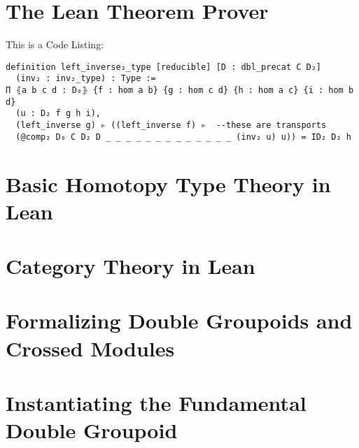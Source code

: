\section{The Lean Theorem Prover}


This is a Code Listing:
\begin{verbatim}
definition left_inverse₂_type [reducible] [D : dbl_precat C D₂] 
  (inv₂ : inv₂_type) : Type :=
Π ⦃a b c d : D₀⦄ {f : hom a b} {g : hom c d} {h : hom a c} {i : hom b d}
  (u : D₂ f g h i),
  (left_inverse g) ▹ ((left_inverse f) ▹  --these are transports
  (@comp₂ D₀ C D₂ D _ _ _ _ _ _ _ _ _ _ _ _ _ (inv₂ u) u)) = ID₂ D₂ h
\end{verbatim}

\section{Basic Homotopy Type Theory in Lean}

\section{Category Theory in Lean}

\section{Formalizing Double Groupoids and Crossed Modules}

\section{Instantiating the Fundamental Double Groupoid}

